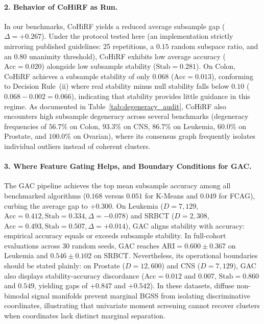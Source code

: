 \documentclass[pdflatex,sn-mathphys-num]{sn-jnl}
\theoremstyle{thmstyleone}
\theoremstyle{thmstyletwo}
\theoremstyle{thmstylethree}
\begin{document}
\paragraph{2. Behavior of CoHiRF as Run.}
In our benchmarks, CoHiRF yields a reduced average subsample gap ($\Delta = +0.267$). Under the protocol tested here (an implementation strictly mirroring published guidelines: 25 repetitions, a $0.15$ random subspace ratio, and an $0.80$ unanimity threshold), CoHiRF exhibits low average accuracy ($\text{Acc} = 0.020$) alongside low subsample stability ($\text{Stab} = 0.281$). On Colon, CoHiRF achieves a subsample stability of only $0.068$ ($\text{Acc}=0.013$), conforming to Decision Rule~(ii) where real stability minus null stability falls below $0.10$ ($0.068 - 0.002 = 0.066$), indicating that stability provides little guidance in this regime. As documented in Table~\ref{tab:degeneracy_audit}, CoHiRF also encounters high subsample degeneracy across several benchmarks (degeneracy frequencies of $56.7\%$ on Colon, $93.3\%$ on CNS, $86.7\%$ on Leukemia, $60.0\%$ on Prostate, and $100.0\%$ on Ovarian), where its consensus graph frequently isolates individual outliers instead of coherent clusters.

\paragraph{3. Where Feature Gating Helps, and Boundary Conditions for GAC.}
The GAC pipeline achieves the top mean subsample accuracy among all benchmarked algorithms ($0.168$ versus $0.051$ for K-Means and $0.049$ for FCAG), curbing the average gap to $+0.300$. On Leukemia ($D=7{,}129$, $\text{Acc} = 0.412, \text{Stab} = 0.334, \Delta = -0.078$) and SRBCT ($D=2{,}308$, $\text{Acc} = 0.493, \text{Stab} = 0.507, \Delta = +0.014$), GAC aligns stability with accuracy: empirical accuracy equals or exceeds subsample stability. In full-cohort evaluations across 30 random seeds, GAC reaches $\text{ARI} = 0.600 \pm 0.367$ on Leukemia and $0.546 \pm 0.102$ on SRBCT. Nevertheless, its operational boundaries should be stated plainly: on Prostate ($D=12{,}600$) and CNS ($D=7{,}129$), GAC also displays stability-accuracy discordance ($\text{Acc} = 0.012$ and $0.007$, $\text{Stab} = 0.860$ and $0.549$, yielding gaps of $\mathbf{+0.847}$ and $\mathbf{+0.542}$). In these datasets, diffuse non-bimodal signal manifolds prevent marginal BGSS from isolating discriminative coordinates, illustrating that univariate moment screening cannot recover clusters when coordinates lack distinct marginal separation.
\end{document}
